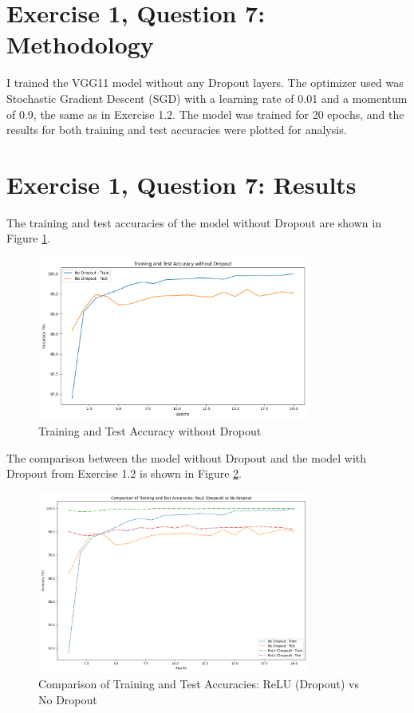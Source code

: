 \documentclass[10pt,letter,notitlepage]{article}
\begin{document}
\begin{center}
\section{Exercise 1, Question 7: Methodology}
I trained the VGG11 model without any Dropout layers. The optimizer used was Stochastic Gradient Descent (SGD) with a learning rate of 0.01 and a momentum of 0.9, the same as in Exercise 1.2. The model was trained for 20 epochs, and the results for both training and test accuracies were plotted for analysis.

\section{Exercise 1, Question 7: Results}
The training and test accuracies of the model without Dropout are shown in Figure \ref{fig:nodropout_performance}.

\begin{figure}[H]
    \centering
    \includegraphics[width=0.8\textwidth]{nodropout_performance.png}
    \caption{Training and Test Accuracy without Dropout}
    \label{fig:nodropout_performance}
\end{figure}

The comparison between the model without Dropout and the model with Dropout from Exercise 1.2 is shown in Figure \ref{fig:relu_vs_nodropout}.

\begin{figure}[H]
    \centering
    \includegraphics[width=0.8\textwidth]{comparison_relu_nodropout.png}
    \caption{Comparison of Training and Test Accuracies: ReLU (Dropout) vs No Dropout}
    \label{fig:relu_vs_nodropout}
\end{figure}


\end{center}
\end{document}

